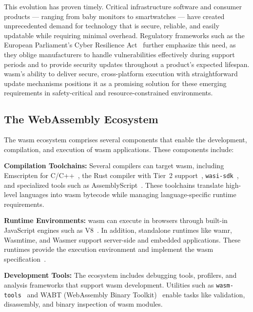 This evolution has proven timely. Critical infrastructure software and consumer products --- ranging from baby monitors to smartwatches --- have created unprecedented demand for technology that is secure, reliable, and easily updatable while requiring minimal overhead. Regulatory frameworks such as the European Parliament's Cyber Resilience Act~\cite{eu_cyber_res_act} further emphasize this need, as they oblige manufacturers to handle vulnerabilities effectively during support periods and to provide security updates throughout a product's expected lifespan. \acrshort{wasm}'s ability to deliver secure, cross-platform execution with straightforward update mechanisms positions it as a promising solution for these emerging requirements in safety-critical and resource-constrained environments.

\subsection{The WebAssembly Ecosystem}
\label{subsec:wasm-ecosystem}

The \acrshort{wasm} ecosystem comprises several components that enable the development, compilation, and execution of \acrshort{wasm} applications. These components include:

\textbf{Compilation Toolchains:} Several compilers can target \acrshort{wasm}, including Emscripten for C/C++~\cite{emscripten_git}, the Rust compiler with Tier~2 support~\cite{rust_wasm_target}, \texttt{wasi-sdk}~\cite{wasisdk}, and specialized tools such as AssemblyScript~\cite{assemblyscript_git}. These toolchains translate high-level languages into \acrshort{wasm} bytecode while managing language-specific runtime requirements.

\textbf{Runtime Environments:} \acrshort{wasm} can execute in browsers through built-in JavaScript engines such as V8~\cite{v8_wasm}. In addition, standalone runtimes like \acrshort{wamr}, Wasmtime, and Wasmer support server-side and embedded applications. These runtimes provide the execution environment and implement the \acrshort{wasm} specification~\cite{wasm_specs}.

\textbf{Development Tools:} The ecosystem includes debugging tools, profilers, and analysis frameworks that support \acrshort{wasm} development. Utilities such as \texttt{wasm-tools}~\cite{wasm_tools_git} and WABT (WebAssembly Binary Toolkit)~\cite{wabt_git} enable tasks like validation, disassembly, and binary inspection of \acrshort{wasm} modules.

